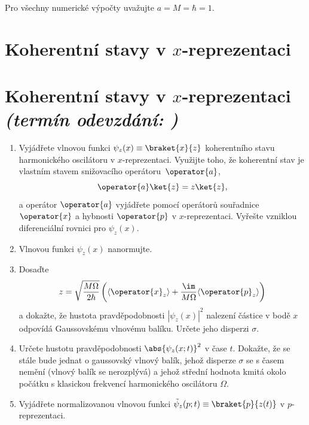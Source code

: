 \documentclass[a4paper,11pt,twoside]{book}
\def\np{\newpage}
\newcommand{\exercise}[2][]{\ifthenelse{\isempty{#1}}
	{\np\section{#2}}
	{\np\section[#2]{{#2} \small{\it{(termín odevzdání: {#1})}}}}
}
\begin{document}
    Pro všechny numerické výpočty uvažujte $a=M=\hbar=1$.

\exercise{Koherentní stavy v $x$-reprezentaci}
    \begin{enumerate}
    \item 
        Vyjádřete vlnovou funkci $\psi_{z}(x)\equiv\braket{x}{z}$ koherentního stavu harmonického oscilátoru v $x$-reprezentaci.
        Využijte toho, že koherentní stav je vlastním stavem snižovacího operátoru~$\operator{a}$,
        \begin{equation*}
            \operator{a}\ket{z}=z\ket{z},
        \end{equation*}
        a operátor $\operator{a}$ vyjádřete pomocí operátorů souřadnice $\operator{x}$ a hybnosti $\operator{p}$ v $x$-reprezentaci.
        Vyřešte vzniklou diferenciální rovnici pro $\psi_{z}(x)$.

    \item Vlnovou funkci $\psi_{z}(x)$ nanormujte.

    \item 
        Dosaďte 
        \begin{equation*}
            z=\sqrt{\frac{M\Omega}{2\hbar}}\left(\langle\operator{x}_{z}\rangle+\frac{\im}{M\Omega}\langle\operator{p}_{z}\rangle\right)
        \end{equation*}
        a dokažte, že hustota pravděpodobnosti $|\psi_{z}(x)|^{2}$ nalezení částice v bodě $x$ odpovídá Gaussovskému vlnovému balíku.
        Určete jeho disperzi $\sigma$.

    \item 
        Určete hustotu pravděpodobnosti $\abs{\psi_{z}(x;t)}^2$ v čase $t$.
        Dokažte, že se stále bude jednat o gaussovský vlnový balík, jehož disperze $\sigma$ se s časem nemění (vlnový balík se nerozplývá) a jehož střední hodnota kmitá okolo počátku s klasickou frekvencí harmonického oscilátoru $\Omega$.
        
    \item
        Vyjádřete normalizovanou vlnovou funkci $\tilde{\psi}_{z}(p;t)\equiv\braket{p}{z(t)}$ v $p$-reprezentaci.

    \end{enumerate}
\end{document}
